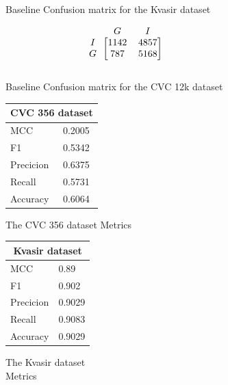 \begin{figure}[h]
\begin{subfigure}[b]{0.49\textwidth}
        
\caption{Baseline Confusion matrix for the Kvasir dataset}
\label{mat:kvasir_CM_IRV2_base}
\end{subfigure}
\begin{subfigure}[b]{0.25\textwidth}
        \[
\begin{blockarray}{ccc}
& G & I  \\
\begin{block}{c[cc]}
 		I&1142 & 4857\\
        G&787  & 5168\\
\end{block}
\end{blockarray}
\]   
\caption{Baseline Confusion matrix for the CVC 12k dataset}
\label{mat:cvc12k_CM_IRV2_base}
\end{subfigure}
\caption{Confusion matrices for the three datasets}
\label{mat:CM_IRV2_base}
\begin{subfigure}[b]{0.25\textwidth}
\begin{tabular}{ll}      
        \toprule
        \multicolumn{2}{c}{CVC 356 dataset}        \\
        \midrule
        MCC 		& 0.2005 \\
        F1  		& 0.5342 \\
        Precicion  	& 0.6375 \\
        Recall     	& 0.5731 \\
        Accuracy	& 0.6064 \\
        \bottomrule
        \end{tabular}
\caption{The CVC 356 dataset Metrics}
\label{tab:cvc356_metrics_IRV2_base}
\end{subfigure}%
\begin{subfigure}[b]{0.49\textwidth}
    	\centering
        \begin{tabular}{ll}
        \toprule
        \multicolumn{2}{c}{Kvasir dataset}        \\
        \midrule
        MCC 		& 0.89 \\
        F1  		& 0.902 \\
        Precicion  	& 0.9029 \\
        Recall     	& 0.9083 \\
        Accuracy	& 0.9029 \\
        \bottomrule
\end{tabular}
\caption{The Kvasir dataset\\ Metrics}
\label{tab:kvasir_metrics_IRV2_base}
\end{subfigure}%
\begin{subfigure}[b]{0.25\textwidth}

\end{subfigure}
\end{figure}
